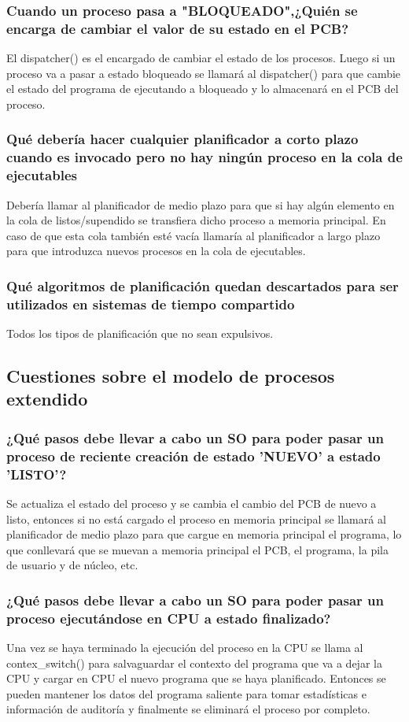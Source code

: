 \documentclass{article}
\begin{document}
				\subsubsection*{Cuando un proceso pasa a "BLOQUEADO",¿Quién se encarga de cambiar el valor de su estado en el PCB?}
					El dispatcher() es el encargado de cambiar el estado de los procesos. Luego si un proceso va a pasar a estado bloqueado se llamará al dispatcher() para que cambie el estado del programa de ejecutando a bloqueado y lo almacenará en el PCB del proceso.
					
				\subsubsection*{Qué debería hacer cualquier planificador a corto plazo cuando es invocado pero no hay ningún proceso en la cola de ejecutables}
					Debería llamar al planificador de medio plazo para que si hay algún elemento en la cola de listos/supendido se transfiera dicho proceso a memoria principal. En caso de que esta cola también esté vacía llamaría al planificador a largo plazo para que introduzca nuevos procesos en la cola de ejecutables.
					
				\subsubsection*{Qué algoritmos de planificación quedan descartados para ser utilizados en sistemas de tiempo compartido}
					Todos los tipos de planificación que no sean expulsivos.
				
			\subsection[Pregunta 2]{Cuestiones sobre el modelo de procesos extendido}
				\subsubsection*{¿Qué pasos debe llevar a cabo un SO para poder pasar un proceso de reciente creación de estado 'NUEVO' a estado 'LISTO'?}
					Se actualiza el estado del proceso y se cambia el cambio del PCB de nuevo a listo, entonces si no está cargado el proceso en memoria principal se llamará al planificador de medio plazo para que cargue en memoria principal el programa, lo que conllevará que se muevan a memoria principal el PCB, el programa, la pila de usuario y de núcleo, etc.
				
				\subsubsection*{¿Qué pasos debe llevar a cabo un SO para poder pasar un proceso ejecutándose en CPU a estado finalizado?}
					Una vez se haya terminado la ejecución del proceso en la CPU se llama al contex\_switch() para salvaguardar el contexto del programa que va a dejar la CPU y cargar en CPU el nuevo programa que se haya planificado. Entonces se pueden mantener los datos del programa saliente para tomar estadísticas e información de auditoría y finalmente se eliminará el proceso por completo.
					
\end{document}
